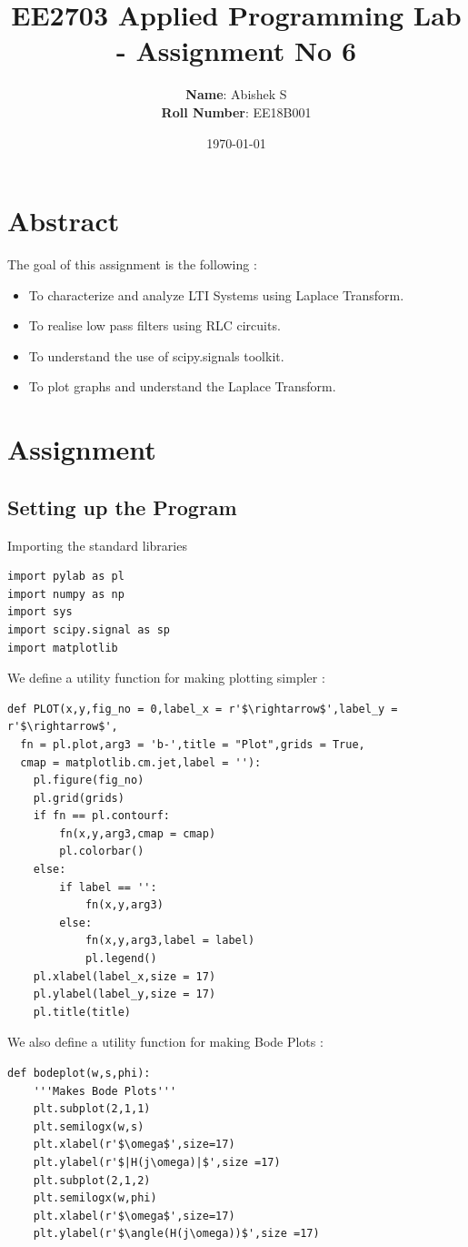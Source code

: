 \documentclass[11pt, a4paper]{article}
\title{EE2703 Applied Programming Lab - Assignment No 6}
\author{
  \textbf{Name}: Abishek S\\
  \textbf{Roll Number}: EE18B001
}\date{\today}
\begin{document}
		
\maketitle 
\section{Abstract}
The goal of this assignment is the following :
\begin{itemize}
\item To characterize and analyze LTI Systems using Laplace Transform.
\item To realise low pass filters using RLC circuits.
\item To understand the use of scipy.signals toolkit.
\item To plot graphs and understand the Laplace Transform.
\end{itemize}

\section{Assignment}
\subsection{Setting up the Program}
Importing the standard libraries
\begin{verbatim}
import pylab as pl
import numpy as np
import sys
import scipy.signal as sp
import matplotlib
\end{verbatim}
We define a utility function for making plotting simpler :
\begin{verbatim}
def PLOT(x,y,fig_no = 0,label_x = r'$\rightarrow$',label_y = r'$\rightarrow$',
  fn = pl.plot,arg3 = 'b-',title = "Plot",grids = True,
  cmap = matplotlib.cm.jet,label = ''):
	pl.figure(fig_no)
	pl.grid(grids)
	if fn == pl.contourf:
		fn(x,y,arg3,cmap = cmap)
		pl.colorbar()
	else:
		if label == '':
			fn(x,y,arg3)
		else:
			fn(x,y,arg3,label = label)
			pl.legend()
	pl.xlabel(label_x,size = 17)
	pl.ylabel(label_y,size = 17)
	pl.title(title)
\end{verbatim}
We also define a utility function for making Bode Plots :
\begin{verbatim}
def bodeplot(w,s,phi):
    '''Makes Bode Plots'''
    plt.subplot(2,1,1)
    plt.semilogx(w,s)
    plt.xlabel(r'$\omega$',size=17)
    plt.ylabel(r'$|H(j\omega)|$',size =17)
    plt.subplot(2,1,2)
    plt.semilogx(w,phi)
    plt.xlabel(r'$\omega$',size=17)
    plt.ylabel(r'$\angle(H(j\omega))$',size =17)
\end{verbatim}
\end{document}
